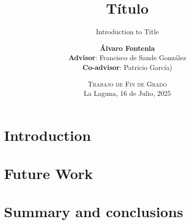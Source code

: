 \documentclass[blue,uncompressed]{beamer}
\title{\textbf{Título}}
\subtitle{Introduction to Title}
\author[Álvaro Fontenla]
{
	\textbf{Álvaro Fontenla} \\ \textbf{Advisor}: Francisco de Sande González \\ \textbf{Co-advisor}: Patricio García)
}
\institute[ULL]
\date[Trabajo de Fin de Grado]{\textsc{Trabajo de Fin de Grado}     \\
                           La Laguna, 16 de Julio, 2025}
\begin{document}
	\begin{frame}[plain]
	\titlepage
	\end{frame}

  \section{Introduction}
  
  
  \section{Future Work}
  
  \section{Summary and conclusions}
  
  
\end{document}
